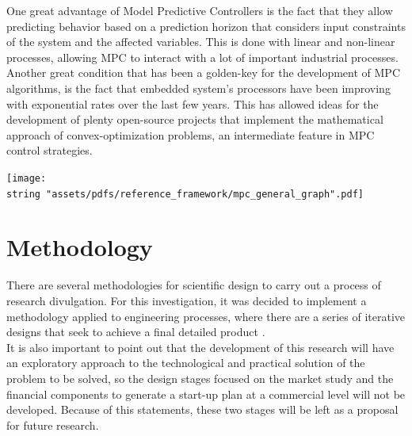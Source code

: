 \documentclass[11pt]{report} %
\begin{document}
One great advantage of Model Predictive Controllers is the fact that they allow predicting behavior based on a prediction horizon that considers input constraints of the system and the affected variables. This is done with linear and non-linear processes, allowing MPC to interact with a lot of important industrial processes.\\

Another great condition that has been a golden-key for the development of MPC algorithms, is the fact that embedded system's processors have been improving with exponential rates over the last few years. This has allowed ideas for the development of plenty open-source projects that implement the mathematical approach of convex-optimization problems, an intermediate feature in MPC control strategies.\\


\begin{center}
\texttt{[image: \\string "assets/pdfs/reference\_framework/mpc\_general\_graph".pdf]}
\bigbreak
\begin{minipage}{\linewidth} %
\label{fig_general_mpc_explained_plot_thermal_article}
\end{minipage} \end{center}




\newpage

\chapter{Methodology}

 There are several methodologies for scientific design to carry out a process of research divulgation. For this investigation, it was decided to implement a methodology applied to engineering processes, where there are a series of iterative designs that seek to achieve a final detailed product \citep{cite_dieter_engineering_design}.\\
 
It is also important to point out that the development of this research will have an exploratory approach to the technological and practical solution of the problem to be solved, so the design stages focused on the market study and the financial components to generate a start-up plan at a commercial level will not be developed. Because of this statements, these two stages will be left as a proposal for future research.\\
\end{document}
